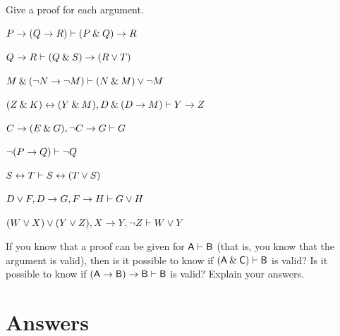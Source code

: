 \problempart
Give a proof for each argument.
\begin{earg}
\item $P \rightarrow (Q \rightarrow R) \vdash (P \mathbin{\&} Q) \rightarrow R$\smallskip
\item $Q \rightarrow R \vdash (Q \mathbin{\&} S) \rightarrow (R \vee T)$\smallskip 
\item $M \mathbin{\&} ({\neg} N \rightarrow {\neg} M) \vdash (N \mathbin{\&} M) \vee {\neg} M$\smallskip
\item $(Z\mathbin{\&} K)\leftrightarrow(Y\mathbin{\&} M), D\mathbin{\&}(D\rightarrow M) \vdash Y\rightarrow Z$\smallskip
\item $C\rightarrow(E\mathbin{\&} G), {\neg} C \rightarrow G \vdash G$\smallskip
\item ${\neg}(P \rightarrow Q) \vdash {\neg} Q$\smallskip
\item $S \leftrightarrow T \vdash S \leftrightarrow (T \vee S)$\smallskip 
\item $D \vee F, D \rightarrow G, F \rightarrow H \vdash G \vee H$\smallskip
\item $(W \vee X) \vee (Y \vee Z), X\rightarrow Y, {\neg} Z \vdash W\vee Y$
\end{earg}


\problempart
If you know that a proof can be given for $\mathsf{A}\vdash\mathsf{B}$ (that is, you know that the argument is valid), then is it possible to know if $(\mathsf{A} \mathbin{\&} \mathsf{C}) \vdash \mathsf{B}$ is valid? Is it possible to know if $(\mathsf{A} \rightarrow \mathsf{B}) \rightarrow \mathsf{B} \vdash \mathsf{B}$ is valid? Explain your answers.



\section{Answers}
\setcounter{ProbPart}{0}

